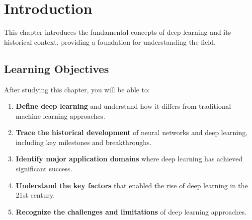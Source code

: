 
\chapter{Introduction}
\label{chap:introduction}

This chapter introduces the fundamental concepts of deep learning and its historical context, providing a foundation for understanding the field.

\section*{Learning Objectives}

After studying this chapter, you will be able to:

\begin{enumerate}
    \item \textbf{Define deep learning} and understand how it differs from traditional machine learning approaches.
    \item \textbf{Trace the historical development} of neural networks and deep learning, including key milestones and breakthroughs.
    \item \textbf{Identify major application domains} where deep learning has achieved significant success.
    \item \textbf{Understand the key factors} that enabled the rise of deep learning in the 21st century.
    \item \textbf{Recognize the challenges and limitations} of deep learning approaches.
\end{enumerate}











